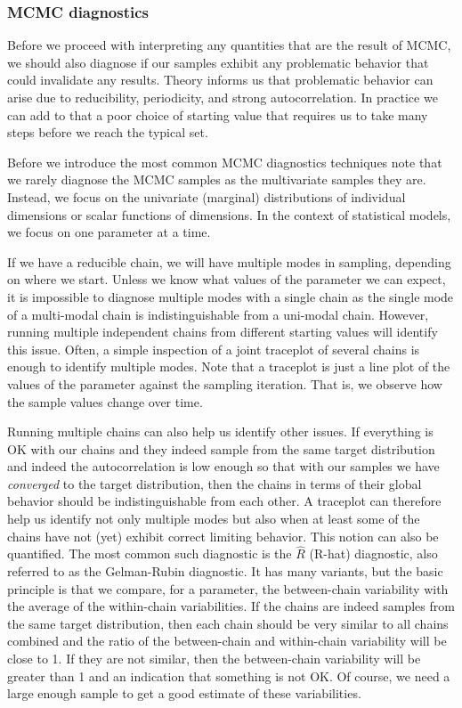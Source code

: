 \documentclass{book}
\theoremstyle{plain}%
\theoremstyle{definition}
\begin{document}
\subsubsection*{MCMC diagnostics}\label{sec:mcmcdiag}

Before we proceed with interpreting any quantities that are the result of MCMC, we should also diagnose if our samples exhibit any problematic behavior that could invalidate any results. Theory informs us that problematic behavior can arise due to reducibility, periodicity, and strong autocorrelation. In practice we can add to that a poor choice of starting value that requires us to take many steps before we reach the typical set.

Before we introduce the most common MCMC diagnostics techniques note that we rarely diagnose the MCMC samples as the multivariate samples they are. Instead, we focus on the univariate (marginal) distributions of individual dimensions or scalar functions of dimensions. In the context of statistical models, we focus on one parameter at a time.

If we have a reducible chain, we will have multiple modes in sampling, depending on where we start. Unless we know what values of the parameter we can expect, it is impossible to diagnose multiple modes with a single chain as the single mode of a multi-modal chain is indistinguishable from a uni-modal chain. However, running multiple independent chains from different starting values will identify this issue. Often, a simple inspection of a joint traceplot of several chains is enough to identify multiple modes. Note that a traceplot is just a line plot of the values of the parameter against the sampling iteration. That is, we observe how the sample values change over time.

Running multiple chains can also help us identify other issues. If everything is OK with our chains and they indeed sample from the same target distribution and indeed the autocorrelation is low enough so that with our samples we have \emph{converged} to the target distribution, then the chains in terms of their global behavior should be indistinguishable from each other. A traceplot can therefore help us identify not only multiple modes but also when at least some of the chains have not (yet) exhibit correct limiting behavior. This notion can also be quantified. The most common such diagnostic is the $\hat{R}$ (R-hat) diagnostic, also referred to as the Gelman-Rubin diagnostic. It has many variants, but the basic principle is that we compare, for a parameter, the between-chain variability with the average of the within-chain variabilities. If the chains are indeed samples from the same target distribution, then each chain should be very similar to all chains combined and the ratio of the between-chain and within-chain variability will be close to 1. If they are not similar, then the between-chain variability will be greater than 1 and an indication that something is not OK. Of course, we need a large enough sample to get a good estimate of these variabilities.
\end{document}
